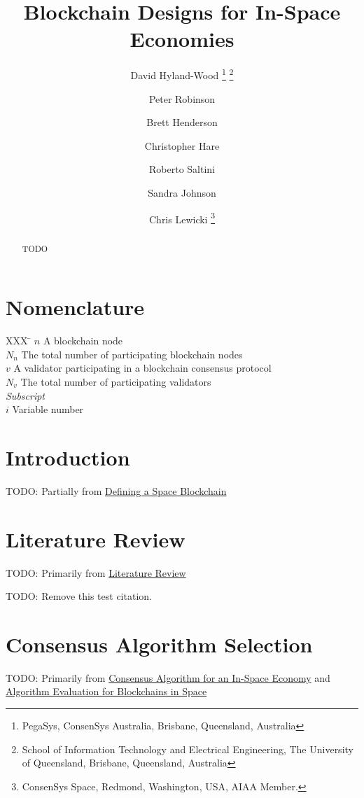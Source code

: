\documentclass[]{aiaa-tc}%
\title{Blockchain Designs for In-Space Economies}
\author{
  David Hyland-Wood%
    \thanks{PegaSys, ConsenSys Australia, Brisbane, Queensland, Australia}
    \thanks{School of Information Technology and Electrical Engineering, The University of Queensland, Brisbane, Queensland, Australia}\\
  \and Peter Robinson\thanksibid{1} \thanksibid{2}
  \and Brett Henderson\thanksibid{1}
  \and Christopher Hare\thanksibid{1}
  \and Roberto Saltini\thanksibid{1}
  \and Sandra Johnson\thanksibid{1}
  \and
  Chris Lewicki%
   \thanks{ConsenSys Space, Redmond, Washington, USA, AIAA Member.}
 }
\begin{document}
\maketitle

\begin{abstract}
TODO
\end{abstract}

\section*{Nomenclature}

\begin{tabbing}
  XXX \= \kill%
  $n$ \> A blockchain node \\
  $N_{n}$ \> The total number of participating blockchain nodes \\
  $v$ \> A validator participating in a blockchain consensus protocol \\
  $N_{v}$ \> The total number of participating validators \\
  \textit{Subscript}\\
  $i$ \> Variable number \\
 \end{tabbing}

\section{Introduction}

TODO: Partially from \href{https://docs.google.com/document/d/1K9YtM1mFtg6TUXoUPOeFBk6uPVdNTkJD7JFjJ4v7Ing/edit}{Defining a Space Blockchain}

\section{Literature Review}

TODO: Primarily from \href{https://docs.google.com/document/d/1rU15AehftYQ6U1uiUhi44GROBVatPzkukOgTyjBBE_M/edit}{Literature Review}

TODO: Remove this test citation\cite{wust_you_2017}.

\section{Consensus Algorithm Selection}

TODO: Primarily from \href{https://docs.google.com/document/d/16O1zB_lcD3egKadkRsFOPac2bynLB9gTbNVr9kFf3HA/edit}{Consensus Algorithm for an In-Space Economy} and \href{https://docs.google.com/document/d/1rzcag5pdtEJBVtK_JrG3c8htZkn-xGRbSOg5MPRNL3s/edit}{Algorithm Evaluation for Blockchains in Space}
\end{document}
